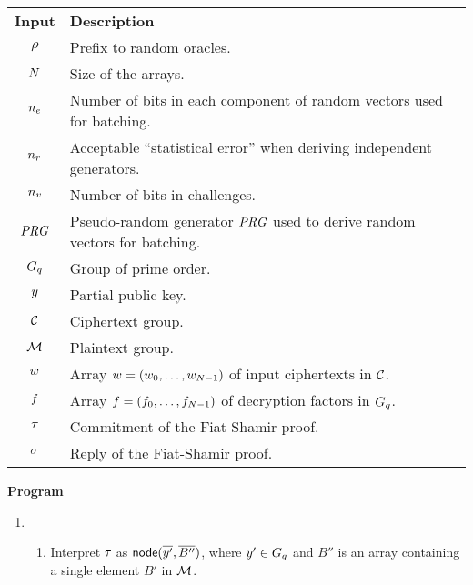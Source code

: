 \documentclass[11pt]{article}
\begin{document}
\begin{nicebox}
\begin{algorithm}\label{algo:decrypt}$\quad$\\

    \vspace{-0.3cm}
    \hspace{-0.3cm}
    \begin{tabular}{cl}
      \textbf{Input} & \textbf{Description}\\
      $\rho$ & Prefix to random oracles.\\
      $N$ & Size of the arrays.\\
      ${n_e}$ & Number of bits in each component of random
      vectors used for batching.\\
      $n_r$ & Acceptable ``statistical error'' when deriving independent generators.\\      
      $n_v$ & Number of bits in challenges.\\
      $\mathit{PRG}$ & Pseudo-random generator $\mathit{PRG}$ used to derive random
      vectors for batching.\\
      $G_{q}$ & Group of prime order.\\ 
      $y$ & Partial public key.\\ 
      $\mathcal{C}$ & Ciphertext group.\\
      $\mathcal{M}$ & Plaintext group.\\
      $w_{}$ & Array $w_{}=(w_{0},\ldots,w_{N-1})$ of input ciphertexts in $\mathcal{C}$.\\
      $f$ & Array $f=(f_{0},\ldots,f_{N-1})$ of decryption factors in $G_{q}$.\\
      $\tau_{}$ & Commitment of the Fiat-Shamir proof.\\
      $\sigma_{}$ & Reply of the Fiat-Shamir proof.
    \end{tabular}

    \vspace{0.2cm}
    \noindent
    \textbf{Program}

    \vspace{-0.3cm}
    \begin{enumerate}

    \item 
      \begin{enumerate}
      \item Interpret $\tau_{}$ as $\textsf{node}(\overline{y'},\overline{B''})$, where
        $y'\in G_{q}$ and $B''$ is an array containing a single element $B'$
        in $\mathcal{M}$.


\end{enumerate}
\end{enumerate}
\end{algorithm}
\end{nicebox}
\end{document}
